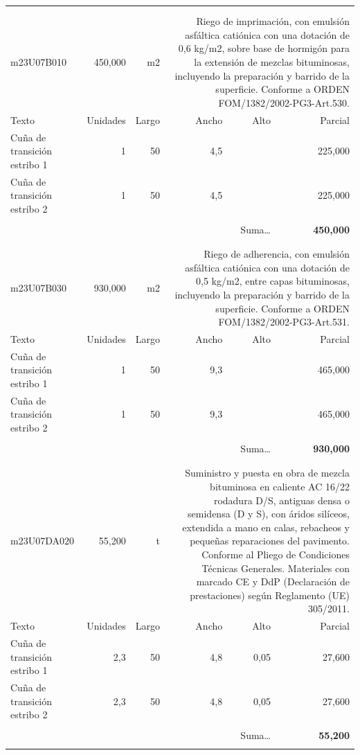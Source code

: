 \documentclass{book}%
\begin{document}
\begin{longtable}{lrrrrr}
\hline%
&&&&&\\%
&&&&&\\%
m23U07B010&   450,000& m2&\multicolumn{3}{p{6cm}}{\scriptsize Riego de imprimación, con emulsión asfáltica catiónica con una dotación de 0,6 kg/m2, sobre base de hormigón para la extensión de mezclas bituminosas, incluyendo la preparación y barrido de la superficie. Conforme a ORDEN FOM/1382/2002-PG3-Art.530.\normalsize}\\%
Texto&Unidades&Largo&Ancho&Alto&Parcial\\%
\hline%
\multicolumn{1}{p{3.5cm}}{Cuña de transición estribo 1}&1&50&4,5&&   225,000\\%
\multicolumn{1}{p{3.5cm}}{Cuña de transición estribo 2}&1&50&4,5&&   225,000\\%
&&&&&\\%
\multicolumn{5}{r}{Suma\ldots}&\textbf{   450,000}\\%
\hline%
&&&&&\\%
&&&&&\\%
m23U07B030&   930,000& m2&\multicolumn{3}{p{6cm}}{\scriptsize Riego de adherencia, con emulsión asfáltica catiónica con una dotación de 0,5 kg/m2, entre capas bituminosas, incluyendo la preparación y barrido de la superficie. Conforme a ORDEN FOM/1382/2002-PG3-Art.531.\normalsize}\\%
Texto&Unidades&Largo&Ancho&Alto&Parcial\\%
\hline%
\multicolumn{1}{p{3.5cm}}{Cuña de transición estribo 1}&1&50&9,3&&   465,000\\%
\multicolumn{1}{p{3.5cm}}{Cuña de transición estribo 2}&1&50&9,3&&   465,000\\%
&&&&&\\%
\multicolumn{5}{r}{Suma\ldots}&\textbf{   930,000}\\%
\hline%
&&&&&\\%
&&&&&\\%
m23U07DA020&    55,200& t&\multicolumn{3}{p{6cm}}{\scriptsize Suministro y puesta en obra de mezcla bituminosa en caliente AC 16/22 rodadura D/S, antiguas densa o semidensa (D y S), con áridos silíceos, extendida a mano en calas, rebacheos y pequeñas reparaciones del pavimento. Conforme al Pliego de Condiciones Técnicas Generales. Materiales con marcado CE y DdP (Declaración de prestaciones) según Reglamento (UE) 305/2011.\normalsize}\\%
Texto&Unidades&Largo&Ancho&Alto&Parcial\\%
\hline%
\multicolumn{1}{p{3.5cm}}{Cuña de transición estribo 1}&2,3&50&4,8&0,05&    27,600\\%
\multicolumn{1}{p{3.5cm}}{Cuña de transición estribo 2}&2,3&50&4,8&0,05&    27,600\\%
&&&&&\\%
\multicolumn{5}{r}{Suma\ldots}&\textbf{    55,200}\\%
\hline%
&&&&&\\%
\end{longtable}%
\newpage
\end{document}
